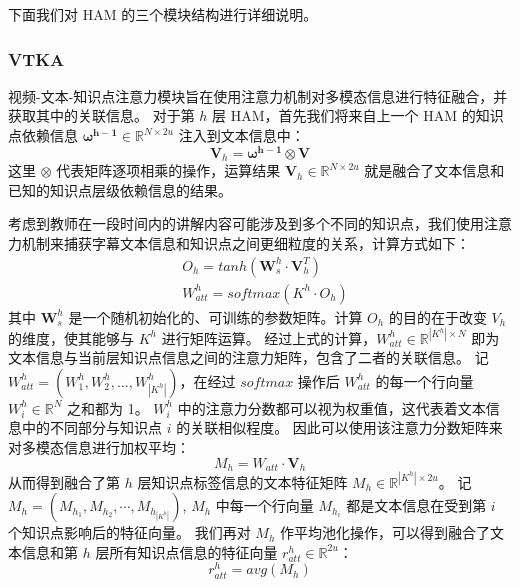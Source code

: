    下面我们对 HAM 的三个模块结构进行详细说明。

    \subsubsection{VTKA}
    视频-文本-知识点注意力模块旨在使用注意力机制对多模态信息进行特征融合，并获取其中的关联信息。
    对于第 $h$ 层 HAM，首先我们将来自上一个 HAM 的知识点依赖信息 $\boldsymbol{\omega^{h - 1}} \in \mathbb{R}^{N \times 2u}$ 注入到文本信息中：
    \begin{equation}
        \boldsymbol{V}_h = \boldsymbol{\omega^{h - 1}} \otimes \boldsymbol{V}
    \end{equation}
    这里 $\otimes$ 代表矩阵逐项相乘的操作，运算结果 $\boldsymbol{V}_h \in \mathbb{R}^{N \times 2u}$ 就是融合了文本信息和已知的知识点层级依赖信息的结果。

    考虑到教师在一段时间内的讲解内容可能涉及到多个不同的知识点，我们使用注意力机制来捕获字幕文本信息和知识点之间更细粒度的关系，计算方式如下：
    \begin{equation}
        \begin{aligned}
            &O_h = tanh(\boldsymbol{W}_s^h \cdot \boldsymbol{V}_h^T) \\
            &W_{att}^h = softmax(K^h \cdot O_h)
        \end{aligned}
    \end{equation}
    其中 $\boldsymbol{W}_s^h$ 是一个随机初始化的、可训练的参数矩阵。计算 $O_h$ 的目的在于改变 $V_h$ 的维度，使其能够与 $K^h$ 进行矩阵运算。
    经过上式的计算，$W_{att}^h \in \mathbb{R}^{\left|K^h\right| \times N}$ 即为文本信息与当前层知识点信息之间的注意力矩阵，包含了二者的关联信息。
    记 $W_{att}^h = \left(W_1^h, W_2^h, \dots, W_{\left|K^h\right|}^h\right)$，在经过 $softmax$ 操作后 $W_{att}^h$ 的每一个行向量 $W_i^h \in \mathbb{R}^N$ 之和都为 1。
    $W_i^h$ 中的注意力分数都可以视为权重值，这代表着文本信息中的不同部分与知识点 $i$ 的关联相似程度。
    因此可以使用该注意力分数矩阵来对多模态信息进行加权平均：
    \begin{equation}
        M_h = W_{att} \cdot \boldsymbol{V}_h
    \end{equation}
    从而得到融合了第 $h$ 层知识点标签信息的文本特征矩阵 $M_h \in \mathbb{R}^{{\left|K^h\right|} \times 2u}$。
    记 $M_h = \left(M_{h_1}, M_{h_2}, \cdots, M_{h_{\left|K^h\right|}}\right)$, $M_h$ 中每一个行向量 $M_{h_i}$ 都是文本信息在受到第 $i$ 个知识点影响后的特征向量。
    我们再对 $M_h$ 作平均池化操作，可以得到融合了文本信息和第 $h$ 层所有知识点信息的特征向量 $r_{att}^h \in \mathbb{R}^{2u}$：
    \begin{equation}
        r_{att}^h = avg(M_h)
    \end{equation}


